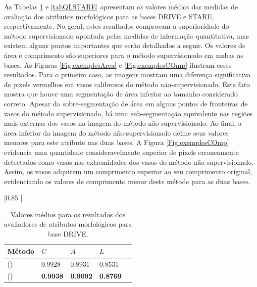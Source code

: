 As Tabelas \ref{tabQLDRIVE} e \ref{tabQLSTARE} apresentam os valores m\'{e}dios das medidas de avalia\c{c}\~{a}o dos atributos morfol\'{o}gicos para as bases DRIVE e STARE, respectivamente. No geral, estes resultados comprovam a superioridade do m\'{e}todo supervisionado apontada pelas medidas de informa\c{c}\~{a}o quantitativa, mas existem alguns pontos importantes que ser\~{a}o detalhados a seguir. Os valores de \'{a}rea e comprimento s\~{a}o superiores para o m\'{e}todo supervisionado em ambas as bases. As Figuras \ref{Fig:exemplesArea} e \ref{Fig:exemplesCOmp} ilustram esses resultados. Para o primeiro caso, as imagens mostram uma diferen\c{c}a significativa de pixels vermelhos em vasos calibrosos do m\'{e}todo n\~{a}o-supervisionado. Este fato mostra que houve uma segmenta\c{c}\~{a}o de \'{a}rea inferior ao tamanho considerado correto. Apesar da sobre-segmenta\c{c}\~{a}o de \'{a}rea em alguns pontos de fronteiras de vasos do m\'{e}todo supervisionado, h\'{a} uma sub-segmenta\c{c}\~{a}o equivalente nas regi\~{o}es mais externas dos vasos na imagem do m\'{e}todo n\~{a}o-supervisionado. Ao final, a \'{a}rea inferior da imagem do m\'{e}todo n\~{a}o-supervisionado define seus valores menores para este atributo nas duas bases. A Figura \ref{Fig:exemplesCOmp} evidencia uma quantidade consideravelmente superior de pixels erroneamente detectados como vasos nas extremidades dos vasos do m\'{e}todo n\~{a}o-supervisionado. Assim, os vasos adquirem um comprimento superior ao seu comprimento original, evidenciando os valores de comprimento menor deste m\'{e}todo para as duas bases.

\begin{table}[h!]
  \caption{Valores m\'{e}dios para os resultados dos avaliadores de atributos morfol\'{o}gicos para base DRIVE.}
  \label{tabQLDRIVE}
  \centering
  [0.85 ]{ 
    \begin{tabular}{lllll}
      \toprule
      M\'{e}todo & $C$ & $A$ & $L$ \\
      \midrule                 
      \citeauthor{Zana:2001} (\citeyear{Zana:2001}) &0.9928 &0.8931 &0.8531 \\

      \citeauthor{Soares:2006} (\citeyear{Soares:2006}) &\textbf{0.9938} &\textbf{0.9092} &\textbf{0.8769}\\

      \bottomrule
    \end{tabular}
  }
\end{table}

